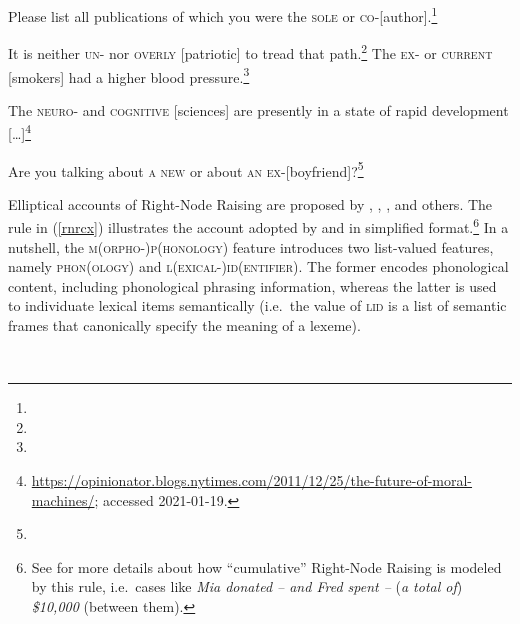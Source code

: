 \eal
\label{rnrex2}
\ex Please list all publications of which you were the \textsc{sole} or
\textsc{co}-[author].\footnote{}
 
\ex  It is neither \textsc{un}- nor \textsc{overly} [patriotic] to tread that path.\footnote{} 
\ex The \textsc{ex-} or \textsc{current} [smokers] had a higher blood pressure.\footnote{} 

\ex The \textsc{neuro}- and \textsc{cognitive} [sciences] are
presently in a state of rapid development
[\ldots]\footnote{\url{https://opinionator.blogs.nytimes.com/2011/12/25/the-future-of-moral-machines/};
  accessed 2021-01-19.}

\ex Are you talking about \textsc{a new}  or about \textsc{an ex}-[boyfriend]?\footnote{}

\zl


Elliptical accounts of Right-Node Raising are proposed by \citet{Beavers},
\citet{Yatabe:04}, \citet{chavesrnr}, and others. The rule in (\ref{rnrcx}) illustrates the account adopted by 
 \citet[874]{chavesrnr}  and \citet*[]{aoi}
  in simplified format.\footnote{See \citet{chavesrnr} for more details about how ``cumulative'' Right-Node Raising is modeled by this rule, i.e.\
 cases like \emph{Mia donated -- and Fred spent --} (\emph{a total of}) \emph{\$10,000} (between them).
}
In a nutshell, the \textsc{m(orpho-)p(honology)} feature introduces two list-valued features, namely \textsc{phon}(\textsc{ology}) and \textsc{l(exical-)id(entifier)}. The former encodes phonological content, including phonological phrasing information,  whereas the latter is used to individuate lexical items semantically (i.e.\  the value
of \textsc{lid} is a list of semantic frames that canonically specify the meaning of a lexeme).


\eas
\label{rnrcx}%
 \impl\\
\zs

